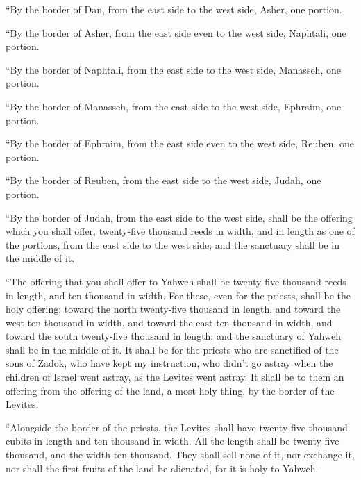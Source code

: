  ``By the border of Dan, from the east side to the west
side, Asher, one portion.

 ``By the border of Asher, from the east side even to the
west side, Naphtali, one portion.

 ``By the border of Naphtali, from the east side to the
west side, Manasseh, one portion.

 ``By the border of Manasseh, from the east side to the
west side, Ephraim, one portion.

 ``By the border of Ephraim, from the east side even to
the west side, Reuben, one portion.

 ``By the border of Reuben, from the east side to the west
side, Judah, one portion.

 ``By the border of Judah, from the east side to the west
side, shall be the offering which you shall offer, twenty-five thousand
reeds in width, and in length as one of the portions, from the east side
to the west side; and the sanctuary shall be in the middle of it.

 ``The offering that you shall offer to Yahweh shall be
twenty-five thousand reeds in length, and ten thousand in width.
 For these, even for the priests, shall be the holy
offering: toward the north twenty-five thousand in length, and toward
the west ten thousand in width, and toward the east ten thousand in
width, and toward the south twenty-five thousand in length; and the
sanctuary of Yahweh shall be in the middle of it.  It
shall be for the priests who are sanctified of the sons of Zadok, who
have kept my instruction, who didn't go astray when the children of
Israel went astray, as the Levites went astray.  It shall
be to them an offering from the offering of the land, a most holy thing,
by the border of the Levites.

 ``Alongside the border of the priests, the Levites shall
have twenty-five thousand cubits in length and ten thousand in width.
All the length shall be twenty-five thousand, and the width ten
thousand.  They shall sell none of it, nor exchange it,
nor shall the first fruits of the land be alienated, for it is holy to
Yahweh.

